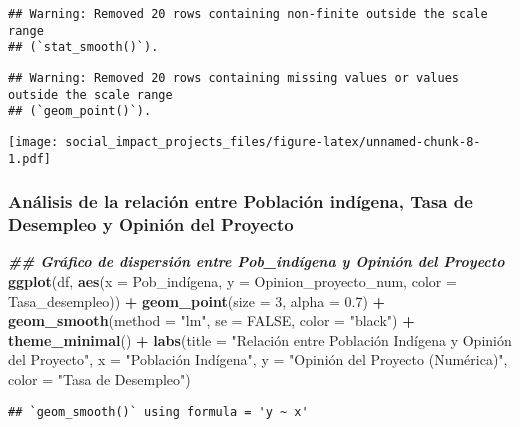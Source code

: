 \documentclass[
]{article}
\newenvironment{Shaded}{\begin{snugshade}}{\end{snugshade}}
\newcommand{\AttributeTok}[1]{\textcolor[rgb]{0.13,0.29,0.53}{#1}}
\newcommand{\ConstantTok}[1]{\textcolor[rgb]{0.56,0.35,0.01}{#1}}
\newcommand{\DecValTok}[1]{\textcolor[rgb]{0.00,0.00,0.81}{#1}}
\newcommand{\DocumentationTok}[1]{\textcolor[rgb]{0.56,0.35,0.01}{\textbf{\textit{#1}}}}
\newcommand{\FloatTok}[1]{\textcolor[rgb]{0.00,0.00,0.81}{#1}}
\newcommand{\FunctionTok}[1]{\textcolor[rgb]{0.13,0.29,0.53}{\textbf{#1}}}
\newcommand{\NormalTok}[1]{#1}
\newcommand{\SpecialCharTok}[1]{\textcolor[rgb]{0.81,0.36,0.00}{\textbf{#1}}}
\newcommand{\StringTok}[1]{\textcolor[rgb]{0.31,0.60,0.02}{#1}}
\begin{document}
\begin{verbatim}
## Warning: Removed 20 rows containing non-finite outside the scale range
## (`stat_smooth()`).
\end{verbatim}

\begin{verbatim}
## Warning: Removed 20 rows containing missing values or values outside the scale range
## (`geom_point()`).
\end{verbatim}

\texttt{[image: social\_impact\_projects\_files/figure-latex/unnamed-chunk-8-1.pdf]}

\subsubsection{\texorpdfstring{\textbf{Análisis de la relación entre
Población indígena, Tasa de Desempleo y Opinión del
Proyecto}}{Análisis de la relación entre Población indígena, Tasa de Desempleo y Opinión del Proyecto}}\label{anuxe1lisis-de-la-relaciuxf3n-entre-poblaciuxf3n-induxedgena-tasa-de-desempleo-y-opiniuxf3n-del-proyecto}

\begin{Shaded}
\begin{Highlighting}[]
\DocumentationTok{\#\# Gráfico de dispersión entre Pob\_indígena y Opinión del Proyecto}
\FunctionTok{ggplot}\NormalTok{(df, }\FunctionTok{aes}\NormalTok{(}\AttributeTok{x =}\NormalTok{ Pob\_indígena, }\AttributeTok{y =}\NormalTok{ Opinion\_proyecto\_num, }\AttributeTok{color =}\NormalTok{ Tasa\_desempleo)) }\SpecialCharTok{+}
  \FunctionTok{geom\_point}\NormalTok{(}\AttributeTok{size =} \DecValTok{3}\NormalTok{, }\AttributeTok{alpha =} \FloatTok{0.7}\NormalTok{) }\SpecialCharTok{+}
  \FunctionTok{geom\_smooth}\NormalTok{(}\AttributeTok{method =} \StringTok{"lm"}\NormalTok{, }\AttributeTok{se =} \ConstantTok{FALSE}\NormalTok{, }\AttributeTok{color =} \StringTok{"black"}\NormalTok{) }\SpecialCharTok{+}
  \FunctionTok{theme\_minimal}\NormalTok{() }\SpecialCharTok{+}
  \FunctionTok{labs}\NormalTok{(}\AttributeTok{title =} \StringTok{"Relación entre Población Indígena y Opinión del Proyecto"}\NormalTok{, }\AttributeTok{x =} \StringTok{"Población Indígena"}\NormalTok{, }
       \AttributeTok{y =} \StringTok{"Opinión del Proyecto (Numérica)"}\NormalTok{, }\AttributeTok{color =} \StringTok{"Tasa de Desempleo"}\NormalTok{)}
\end{Highlighting}
\end{Shaded}

\begin{verbatim}
## `geom_smooth()` using formula = 'y ~ x'
\end{verbatim}
\end{document}
